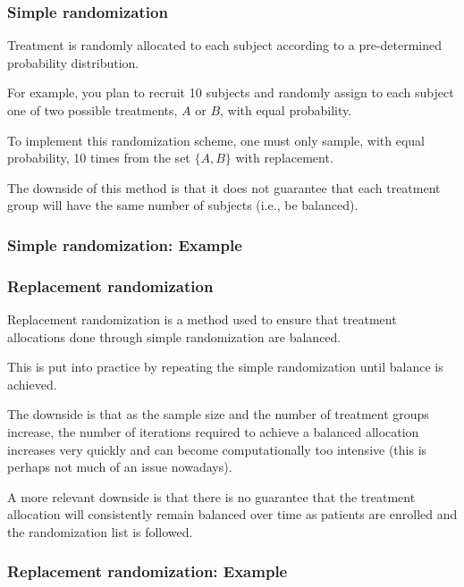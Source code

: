 \documentclass{beamer}
\begin{document}
\begin{frame}
    \frametitle{Simple randomization}
	Treatment is randomly allocated to each subject according to a pre-determined probability distribution.\\
	
	\bigskip
	
	For example, you plan to recruit 10 subjects and randomly assign to each subject 
	one of two possible treatments, $A$ or $B$, with equal probability.
	
	\bigskip
	
	To implement this randomization scheme, one must only sample, with equal probability,
	10 times from the set $\{A, B\}$ with replacement.
	
	\bigskip
	
	The downside of this method is that it does not guarantee that each treatment group will
	have the same number of subjects (i.e., be balanced).
\end{frame}


\begin{frame}[fragile]
    \frametitle{Simple randomization: Example}
	
\end{frame}


\begin{frame}
    \frametitle{Replacement randomization}
	Replacement randomization is a method used to ensure that treatment allocations
	done through simple randomization are balanced.
	
	\bigskip
	
	This is put into practice by repeating the simple randomization until balance is achieved.
	
	\bigskip
	
	The downside is that as the sample size and the number of treatment groups increase, the number
	of iterations required to achieve a balanced allocation increases very quickly and can
	become computationally too intensive (this is perhaps not much of an issue nowadays).
	
	\bigskip
	
	A more relevant downside is that there is no guarantee that the treatment allocation will
	consistently remain balanced over time as patients are enrolled and the randomization
	list is followed.
\end{frame}


\begin{frame}[fragile]
    \frametitle{Replacement randomization: Example}
	
\end{frame}
\end{document}
